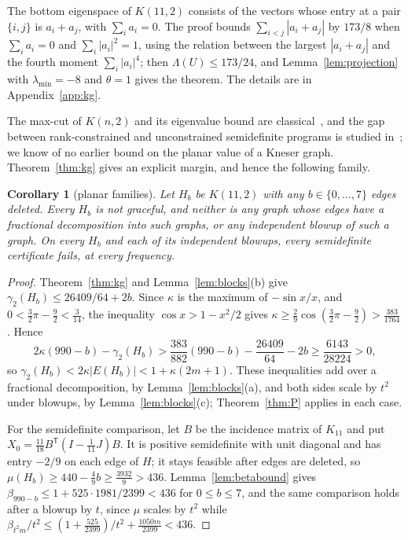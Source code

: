 \documentclass[11pt]{amsart}
\newcommand{\thmmarker}{}
\newcommand{\mgpt}{\gdef\thmmarker{\textsuperscript{$\dagger$}}}
\theoremstyle{tplain}
\newtheorem{corollary}[theorem]{Corollary}
\theoremstyle{tdefinition}
\theoremstyle{tremark}
\newcommand{\lmin}{\lambda_{\min}}
\begin{document}
The bottom eigenspace of $K(11,2)$ consists of the vectors whose entry at a
pair $\{i,j\}$ is $a_i+a_j$, with $\sum_ia_i=0$. The proof bounds
$\sum_{i<j}|a_i+a_j|$ by $173/8$ when $\sum_ia_i=0$ and $\sum_i|a_i|^2=1$, using the relation
between the largest $|a_i+a_j|$ and the fourth moment $\sum_i|a_i|^4$; then
$\Lambda(U)\le173/24$, and Lemma~\ref{lem:projection} with $\lmin=-8$ and
$\theta=1$ gives the theorem. The details are in Appendix~\ref{app:kg}.

The max-cut of $K(n,2)$ and its eigenvalue bound are
classical~\cite{pt,mp}, and the gap between
rank-constrained and unconstrained semidefinite programs is studied
in~\cite{bov}; we know of no earlier bound on the planar value of a
Kneser graph. Theorem~\ref{thm:kg} gives an explicit margin, and hence the
following family.

\mgpt\begin{corollary}[planar families]\label{cor:kg}
Let $H_b$ be $K(11,2)$ with any $b\in\{0,\dots,7\}$ edges deleted. Every
$H_b$ is not graceful, and neither is any graph whose edges have a
fractional decomposition into such graphs, or any independent blowup of
such a graph. On every $H_b$ and each of its independent blowups, every
semidefinite certificate fails, at every frequency.
\end{corollary}

\begin{proof}
Theorem~\ref{thm:kg} and Lemma~\ref{lem:blocks}(b) give
$\gamma_2(H_b)\le26409/64+2b$. Since $\kappa$ is the maximum of
$-\sin x/x$, and $0<\frac32\pi-\frac92<\frac3{14}$, the inequality
$\cos x>1-x^2/2$ gives $\kappa\ge\frac29\cos(\frac32\pi-\frac92)>
\frac{383}{1764}$. Hence
\[
 2\kappa(990-b)-\gamma_2(H_b)
 >\frac{383}{882}(990-b)-\frac{26409}{64}-2b\ge\frac{6143}{28224}>0,
\]
so $\gamma_2(H_b)<2\kappa|E(H_b)|<1+\kappa(2m+1)$. These inequalities add
over a fractional decomposition, by Lemma~\ref{lem:blocks}(a), and both sides
scale by $t^2$ under blowups, by Lemma~\ref{lem:blocks}(c);
Theorem~\ref{thm:P} applies in each case.

For the semidefinite comparison, let $B$ be the incidence matrix of $K_{11}$
and put $X_0=\frac{11}{18}B^{\mathsf T}(I-\frac1{11}J)B$. It is positive
semidefinite with unit diagonal and has entry $-2/9$ on each edge of $H$; it
stays feasible after edges are deleted, so
$\mu(H_b)\ge440-\frac49b\ge\frac{3932}9>436$. Lemma~\ref{lem:betabound} gives
$\beta_{990-b}\le1+525\cdot1981/2399<436$ for $0\le b\le7$, and the same
comparison holds after a blowup by $t$, since $\mu$ scales by $t^2$ while
$\beta_{t^2m}/t^2\le(1+\frac{525}{2399})/t^2+\frac{1050m}{2399}<436$.
\end{proof}
\end{document}
